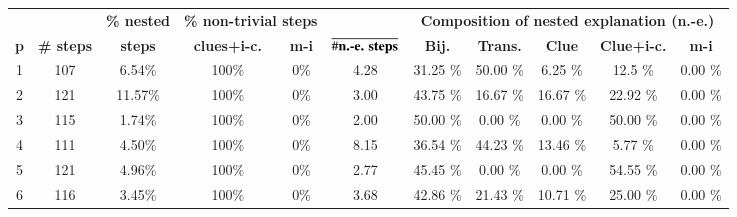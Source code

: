 \begin{table}
	\centering
	\begin{tabular}{c|cc|cc|c|ccccc}
		           &                    & \textbf{\% nested} & \multicolumn{2}{c|}{\textbf{\% non-trivial steps}} & \multicolumn{1}{c|}{} & \multicolumn{5}{c}{\textbf{Composition of nested explanation (n.-e.)}}                                                                                       \\
		\textbf{p} & \textbf{\# steps } & \textbf{steps}     & \textbf{clues+i-c.}                                & \textbf{m-i}          & \textbf{$\overline{ \# \text{\textbf{n.-e. steps}}}$}                  & \textbf{Bij.} & \textbf{Trans.} & \textbf{Clue} & \textbf{Clue+i-c.} & \textbf{m-i} \\\hline
		1          & 107                & 6.54\%             & 100\%                                              & 0\%                   & 4.28                                                                   & 31.25 \%      & 50.00 \%        & 6.25 \%       & 12.5 \%            & 0.00 \%      \\
		2          & 121                & 11.57\%            & 100\%                                              & 0\%                   & 3.00                                                                   & 43.75 \%      & 16.67 \%        & 16.67 \%      & 22.92 \%           & 0.00 \%      \\
		3          & 115                & 1.74\%             & 100\%                                              & 0\%                   & 2.00                                                                   & 50.00 \%      & 0.00 \%         & 0.00 \%       & 50.00 \%           & 0.00 \%      \\
		4          & 111                & 4.50\%             & 100\%                                              & 0\%                   & 8.15                                                                   & 36.54 \%      & 44.23 \%        & 13.46 \%      & 5.77 \%            & 0.00 \%      \\
		5          & 121                & 4.96\%             & 100\%                                              & 0\%                   & 2.77                                                                   & 45.45 \%      & 0.00 \%         & 0.00 \%       & 54.55 \%           & 0.00 \%      \\
		6          & 116                & 3.45\%             & 100\%                                              & 0\%                   & 3.68                                                                   & 42.86 \%      & 21.43 \%        & 10.71 \%      & 25.00 \%           & 0.00 \%      \\

\end{tabular}
\end{table}
